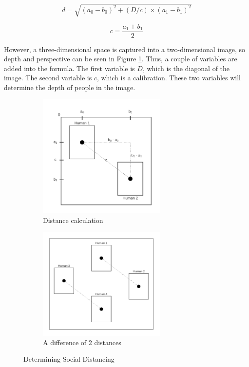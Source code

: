         \begin{equation*}
            d = \sqrt{(a_{0}-b_{0})^{2}+(D/c)\times(a_{1}-b_{1})^{2}}
        \end{equation*}

        \begin{equation*}
            c = \frac{a_{1}+b_{1}}{2}
        \end{equation*}

        However, a three-dimensional space is captured into a two-dimensional image,
        so depth and perspective can be seen in Figure \ref{distanceCalculation}.
        Thus, a couple of variables are added into the formula.
        The first variable is $D$, which is the diagonal of the image.
        The second variable is $c$, which is a calibration.
        These two variables will determine the depth of people in the image.

        \begin{figure}[h!]
            \centering
            \begin{subfigure}{.5\textwidth}
              \centering
              \includegraphics[width=2.5in]{images/chapter2/distance.png}
              \caption{Distance calculation}
              \label{distanceCalculation}
            \end{subfigure}%
            \begin{subfigure}{.5\textwidth}
              \centering
              \includegraphics[width=2.5in]{images/chapter2/two-distances.png}
              \caption{A difference of 2 distances}
              \label{twoDistances}
            \end{subfigure}
            \caption{Determining Social Distancing}
            \label{determiningConcept}
        \end{figure}

